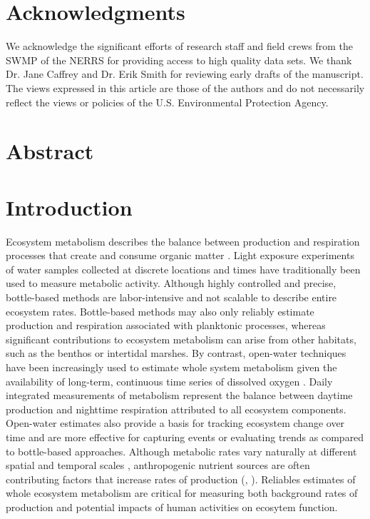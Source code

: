 \documentclass[letterpaper,12pt,oneside]{article}\usepackage[]{graphicx}\usepackage[]{color}
\begin{document}
\raggedbottom
\raggedright
{}
\setlength{\parindent}{0.5in}
\renewcommand\refname{References \vspace{12pt}}



\section{Acknowledgments}

We acknowledge the significant efforts of research staff and field crews from the \acl{SWMP} of the \acl{NERRS} for providing access to high quality data sets.  We thank Dr. Jane Caffrey and Dr. Erik Smith for reviewing early drafts of the manuscript. The views expressed in this article are those of the authors and do not necessarily reflect the views or policies of the U.S. Environmental Protection Agency.

\newpage
\section{Abstract}


\acresetall
\clearpage

\section{Introduction} \label{intro}

Ecosystem metabolism describes the balance between production and respiration processes that create and consume organic matter \citep{Kemp12,Needoba12}.  Light exposure experiments of water samples collected at discrete locations and times have traditionally been used to measure metabolic activity.  Although highly controlled and precise, bottle-based methods are labor-intensive and not scalable to describe entire ecosystem rates.  Bottle-based methods may also only reliably estimate production and respiration associated with planktonic processes, whereas significant contributions to ecosystem metabolism can arise from other habitats, such as the benthos or intertidal marshes.  By contrast, open-water techniques have been increasingly used to estimate whole system metabolism given the availability of long-term, continuous time series of dissolved oxygen \citep{Odum56,Davanzo96}. Daily integrated measurements of metabolism represent the balance between daytime production and nighttime respiration attributed to all ecosystem components.  Open-water estimates also provide a basis for tracking ecosystem change over time and are more effective for capturing events or evaluating trends as compared to bottle-based approaches. Although metabolic rates vary naturally at different spatial and temporal scales \citep{Ziegler98,Caffrey04,Russell07}, anthropogenic nutrient sources are often contributing factors that increase rates of production (\citealt{Nixon95}, ).  Reliables estimates of whole ecosystem metabolism are critical for measuring both background rates of production and potential impacts of human activities on ecosytem function.     
\end{document}
